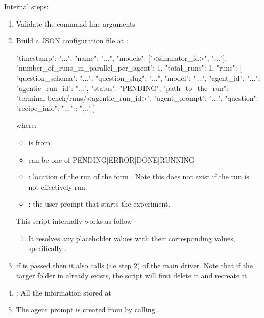 \documentclass[11pt]{article}
\begin{document}
Internal steps:
\begin{enumerate}
  \item Validate the command-line arguments
  \label{sec:agentic-rollout-run-configurations}
  \item Build a JSON configuration file at :
  \begin{DocCode}
    {
      "timestamp": "...",
      "name": "...",
      "models": ["<simulator_id>", "..."],
      "number_of_runs_in_parallel_per_agent": 1,
      "total_runs": 1,
      "runs": [
        {
          "question_schema": "...",
          "question_slug": "...",
          "model": "...",
          "agent_id": "...",
          "agentic_run_id": "...",
          "status": "PENDING",
          "path_to_the_run": "terminal-bench/runs/<agentic_run_id>",
          "agent_prompt": "...",
          "question": {
            "recipe_info": { "..." : "..." }
          }
        }
      ]
    }
    \end{DocCode}
  where:
  \begin{itemize}
    \item {} is from 
    \item {} can be one of PENDING|ERROR|DONE|RUNNING
    \item {}: location of the run of the form . 
    Note this does not exist if the run is not effectively run.
    \item {}: the user prompt that starts the experiment. 
  \end{itemize} 
  This script internally works as follow
    \begin{enumerate}
      \item It resolves any placeholder values with their corresponding values, specifically .
    \end{enumerate}
    \item if  is passed then it also calls  (i.e step 2) of the main driver. 
    Note that if the targer folder in  already exists, the script will first delete it and recreate it.
    \item {}: All the information stored at 
    \item The agent prompt is created from \hyperref[sec:generate-question-question-text]{} by calling .


\end{enumerate}
\end{document}
